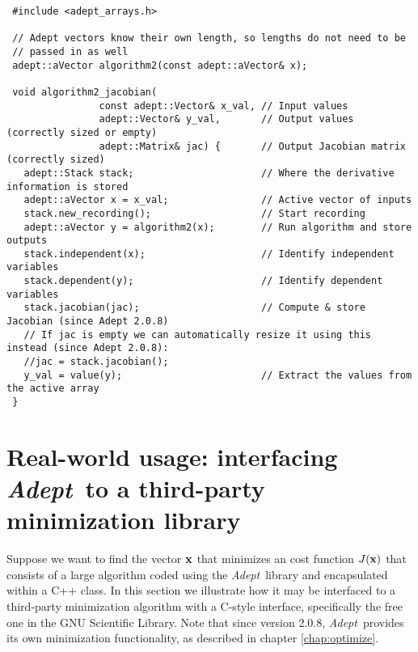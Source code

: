\documentclass[a4,oneside]{book}
\def\x{\ensuremath{{\bf x}}}
\def\Adept{\emph{Adept}}
\begin{document}
\begin{lstlisting}
 #include <adept_arrays.h>

 // Adept vectors know their own length, so lengths do not need to be
 // passed in as well
 adept::aVector algorithm2(const adept::aVector& x);

 void algorithm2_jacobian(
                const adept::Vector& x_val, // Input values
                adept::Vector& y_val,       // Output values (correctly sized or empty)
                adept::Matrix& jac) {       // Output Jacobian matrix (correctly sized)
   adept::Stack stack;                      // Where the derivative information is stored
   adept::aVector x = x_val;                // Active vector of inputs
   stack.new_recording();                   // Start recording
   adept::aVector y = algorithm2(x);        // Run algorithm and store outputs
   stack.independent(x);                    // Identify independent variables
   stack.dependent(y);                      // Identify dependent variables
   stack.jacobian(jac);                     // Compute & store Jacobian (since Adept 2.0.8)
   // If jac is empty we can automatically resize it using this instead (since Adept 2.0.8):
   //jac = stack.jacobian();
   y_val = value(y);                        // Extract the values from the active array
 }
\end{lstlisting}

\section{Real-world usage: interfacing \Adept\ to a third-party minimization library}
\label{sec:realworld}
Suppose we want to find the vector $\x$ that minimizes an cost
function $J(\x)$ that consists of a large algorithm coded using the
\Adept\ library and encapsulated within a C++ class.  In this section
we illustrate how it may be interfaced to a third-party minimization
algorithm with a C-style interface, specifically the free one in the
GNU Scientific Library.  Note that since version 2.0.8,
\Adept\ provides its own minimization functionality, as described in
chapter \ref{chap:optimize}.
\end{document}
